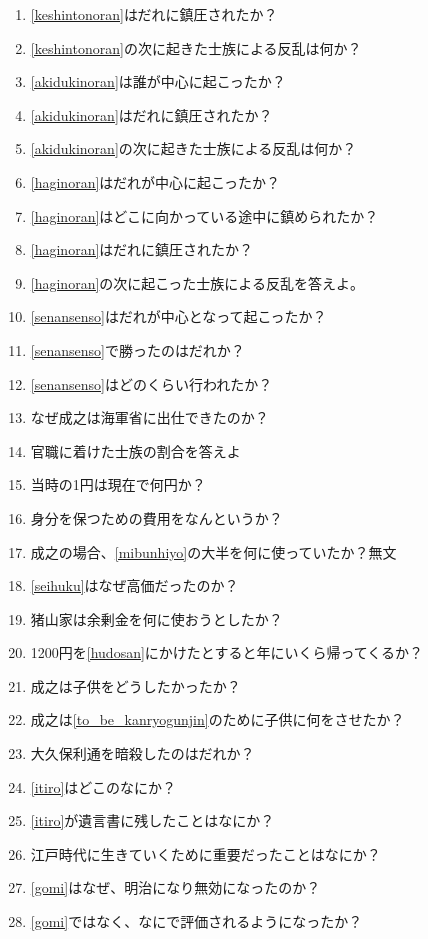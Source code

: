 \documentclass[]{jsarticle}
\begin{document}
\begin{enumerate}
	\item \ref{keshintonoran}はだれに鎮圧されたか？
	\item \ref{keshintonoran}の次に起きた士族による反乱は何か？\label{akidukinoran}
	\item \ref{akidukinoran}は誰が中心に起こったか？
	\item \ref{akidukinoran}はだれに鎮圧されたか？
	\item \ref{akidukinoran}の次に起きた士族による反乱は何か？\label{haginoran}
	\item \ref{haginoran}はだれが中心に起こったか？
	\item \ref{haginoran}はどこに向かっている途中に鎮められたか？
	\item \ref{haginoran}はだれに鎮圧されたか？
	\item \ref{haginoran}の次に起こった士族による反乱を答えよ。\label{senansenso}
	\item \ref{senansenso}はだれが中心となって起こったか？
	\item \ref{senansenso}で勝ったのはだれか？
	\item \ref{senansenso}はどのくらい行われたか？
	\item なぜ成之は海軍省に出仕できたのか？
	\item 官職に着けた士族の割合を答えよ
	\item 当時の1円は現在で何円か？
	\item 身分を保つための費用をなんというか？\label{mibunhiyo}
	\item 成之の場合、\ref{mibunhiyo}の大半を何に使っていたか？無文\label{seihuku}
	\item \ref{seihuku}はなぜ高価だったのか？
	\item 猪山家は余剰金を何に使おうとしたか？\label{hudosan}
	\item 1200円を\ref{hudosan}にかけたとすると年にいくら帰ってくるか？
	\item 成之は子供をどうしたかったか？\label{to_be_kanryogunjin}
	\item 成之は\ref{to_be_kanryogunjin}のために子供に何をさせたか？
	\item 大久保利通を暗殺したのはだれか？\label{itiro}
	\item \ref{itiro}はどこのなにか？
	\item \ref{itiro}が遺言書に残したことはなにか？
	\item 江戸時代に生きていくために重要だったことはなにか？\label{gomi}
	\item \ref{gomi}はなぜ、明治になり無効になったのか？
	\item \ref{gomi}ではなく、なにで評価されるようになったか？

\end{enumerate}
\end{document}
